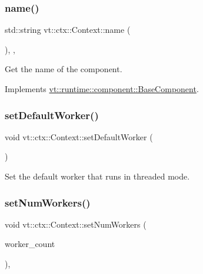 \subsubsection{\texorpdfstring{name()}{name()}}
{\footnotesize\ttfamily std\+::string vt\+::ctx\+::\+Context\+::name (\begin{DoxyParamCaption}{ }\end{DoxyParamCaption})\hspace{0.3cm}{\ttfamily [inline]}, {\ttfamily [override]}, {\ttfamily [virtual]}}



Get the name of the component. 



Implements \hyperlink{structvt_1_1runtime_1_1component_1_1_base_component_a7701485f3539f78d42e6bad47fc7eb78}{vt\+::runtime\+::component\+::\+Base\+Component}.

\mbox{\label{structvt_1_1ctx_1_1_context_ab61a961c47c8fc6393df8c121ade3aa2}} 
\subsubsection{\texorpdfstring{set\+Default\+Worker()}{setDefaultWorker()}}
{\footnotesize\ttfamily void vt\+::ctx\+::\+Context\+::set\+Default\+Worker (\begin{DoxyParamCaption}{ }\end{DoxyParamCaption})\hspace{0.3cm}{\ttfamily [private]}}



Set the default worker that runs in threaded mode. 

\mbox{\label{structvt_1_1ctx_1_1_context_afc4549ac9cdae67301613613b9381d1c}} 
\subsubsection{\texorpdfstring{set\+Num\+Workers()}{setNumWorkers()}}
{\footnotesize\ttfamily void vt\+::ctx\+::\+Context\+::set\+Num\+Workers (\begin{DoxyParamCaption}\item[{\hyperlink{namespacevt_aa93398ea48f2cb6c188512250f7cc248}{Worker\+Count\+Type} const}]{worker\+\_\+count }\end{DoxyParamCaption})\hspace{0.3cm}{\ttfamily [inline]}, {\ttfamily [protected]}}



